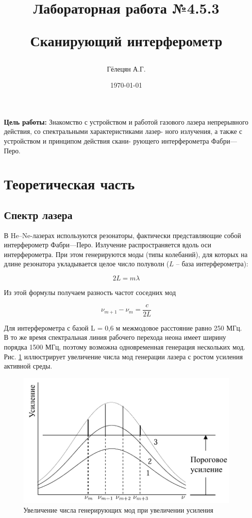 \documentclass{article}
\title{\begin{center}Лабораторная работа №4.5.3\end{center}
Сканирующий интерферометр}
\author{Гёлецян А.Г.}
\date{\today}
\begin{document}
\maketitle
\newpage
{}

\textbf{Цель работы:} Знакомство с устройством и работой газового лазера
непрерывного действия, со спектральными характеристиками лазер-
ного излучения, а также с устройством и принципом действия скани-
рующего интерферометра Фабри—Перо.

\section{Теоретическая часть}
\subsection{Спектр лазера}
В He–Ne-лазерах используются резонаторы, фактически представляющие собой интерферометр
Фабри—Перо. Излучение распространяется вдоль оси интерферометра. При этом генерируются
моды (типы колебаний), для которых на длине резонатора укладывается целое число полуволн
($L$ -- база интерферометра):

\begin{equation}
    2L=m\lambda
    \label{eq:mode_distance_lambda}
\end{equation}

Из этой формулы получаем разность частот соседних мод

\begin{equation}
    \nu_{m+1} - \nu_{m} = \frac{c}{2L}
    \label{eq:mode_distance_freq}
\end{equation}

Для интерферометра с базой L = 0,6 м межмодовое расстояние равно
250 МГц. В то же время спектральная линия рабочего перехода неона
имеет ширину порядка 1500 МГц, поэтому возможна одновременная
генерация нескольких мод. Рис. \ref{fig:multimodes} иллюстрирует увеличение числа мод
генерации лазера с ростом усиления активной среды.

\begin{figure}[h]
    \center\includegraphics[width = 0.6\linewidth]{multimodes.png}
    \caption{Увеличение числа генерирующих мод при увеличении усиления}\label{fig:multimodes}
\end{figure}
\end{document}
